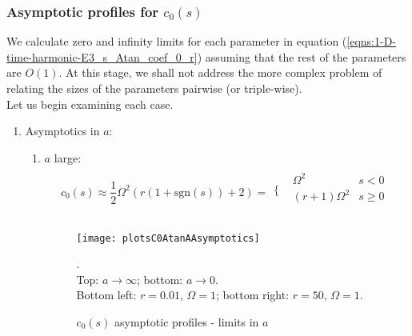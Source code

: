 \documentclass[12pt,twoside]{article}
\begin{document}
\subsubsection{Asymptotic profiles for $c_0(s)$} 

We calculate zero and infinity limits for each parameter in equation (\ref{eqns:1-D-time-harmonic-E3_s_Atan_coef_0_r}) assuming that the rest of the parameters are $O(1)$. At this stage, we shall not address the more complex problem of relating the sizes of the parameters pairwise (or triple-wise).\\
Let us begin examining each case.

\begin{enumerate}



\item Asymptotics in $a$:
	\begin{enumerate}
	\item $a$ large: 
	\begin{align}
	\label{eqns:1-D-time-harmonic-E3_s_Atan_coef_0_non_dim_a_inf}
	c_0(s) \approx \dfrac{1}{2} \Omega ^2 (r (1+\text{sgn}(s))+2) = \begin{array}{cc}
	\Big \{ & 
	\begin{array}{cc}
	 \Omega ^2 & s<0 \\
 	(r+1) \Omega ^2 & s \geq 0 \\
	\end{array}
 	\\
	\end{array}
	\end{align}
	
\begin{figure}
\begin{center}
\texttt{[image: plotsC0AtanAAsymptotics]}
\end{center}
\caption {$c_0(s)$ asymptotic profiles - limits in $a$}.\\
Top: $a \rightarrow \infty$; bottom: $a \rightarrow 0$.\\
Bottom left: $r=0.01$, $\Omega = 1$; bottom right: $r=50$, $\Omega = 1$.
\label{fig:c0AtanAlim}
\end{figure}



\end{enumerate}
\end{enumerate}
\end{document}
